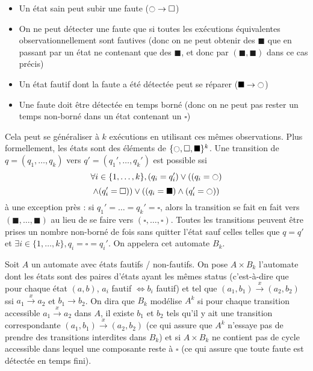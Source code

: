 \documentclass[conference]{IEEEtran}
\newcommand{\es}{\square}
\newcommand{\fs}{\blacksquare}
\newcommand{\ec}{\ocircle}
\begin{document}
\begin{itemize}
	\item Un état sain peut subir une faute ($\ec \to \es$)
	\item On ne peut détecter une faute que si toutes les exécutions équivalentes observationnellement sont fautives (donc on ne peut obtenir des $\fs$ que en passant par un état ne contenant que des $\fs$, et donc par $(\fs,\fs)$ dans ce cas précis)
	\item Un état fautif dont la faute a été détectée peut se réparer ($\fs\to \ec$)
	\item Une faute doit être détectée en temps borné (donc on ne peut pas rester un temps non-borné dans un état contenant un $\es$)
\end{itemize}

Cela peut se généraliser à $k$ exécutions en utilisant ces mêmes observations. Plus formellement, les états sont des éléments de $\{\ec, \es, \fs \}^k$. Une transition de $q=(q_1, \dots, q_k)$ vers $q'=(q_1',\dots,q_k')$ est possible ssi $$\forall i \in \{1, \dots, k\}, (q_i = q_i')\lor ((q_i = \ec) $$$$\land (q_i'=\es)) \lor ((q_i = \fs)\land (q_i' = \ec))$$
\`a une exception près : si $q_1'=\dots=q_k'=\es$, alors la transition se fait en fait vers $(\fs, \dots, \fs)$ au lieu de se faire vers $(\es, \dots, \es)$. Toutes les transitions peuvent être prises un nombre non-borné de fois sans quitter l'état sauf celles telles que $q= q'$ et $\exists i\in \{1, \dots, k\}, q_i = \es = q_i'$. On appelera cet automate $B_k$.

Soit $A$ un automate avec états fautifs / non-fautifs. On pose $A\times B_k$ l'automate dont les états sont des paires d'états ayant les mêmes status (c'est-à-dire que pour chaque état $(a, b)$, $a_i$ fautif $\iff b_i$ fautif) et tel que $(a_1,b_1)\overset{x}{\to}(a_2, b_2)$ ssi $a_1\overset{x}{\to} a_2$ et $b_1 \to b_2$. On dira que $B_k$ modélise $A^k$ si pour chaque transition accessible $a_1\overset{x}{\to} a_2$ dans $A$, il existe $b_1$ et $b_2$ tels qu'il y ait une transition correspondante $(a_1,b_1)\overset{x}{\to}(a_2, b_2)$ (ce qui assure que $A^k$ n'essaye pas de prendre des transitions interdites dans $B_k$) et si $A\times B_k$ ne contient pas de cycle accessible dans lequel une composante reste à $\es$ (ce qui assure que toute faute est détectée en temps fini). 
\end{document}
